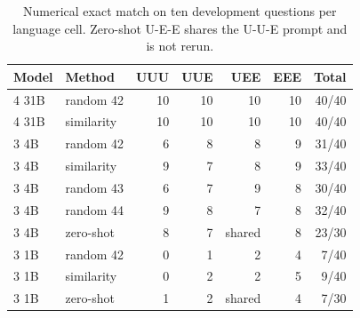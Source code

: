 \begin{table}[t]
\caption{Numerical exact match on ten development questions per language cell. Zero-shot U-E-E shares the U-U-E prompt and is not rerun.}
\label{tab:baseline}
\centering
\setlength{\tabcolsep}{2.6pt}
\small
\begin{tabular}{llrrrrr}
\toprule
Model & Method & UUU & UUE & UEE & EEE & Total \\
\midrule
4 31B & random 42 & 10 & 10 & 10 & 10 & 40/40 \\
4 31B & similarity & 10 & 10 & 10 & 10 & 40/40 \\
3 4B & random 42 & 6 & 8 & 8 & 9 & 31/40 \\
3 4B & similarity & 9 & 7 & 8 & 9 & 33/40 \\
3 4B & random 43 & 6 & 7 & 9 & 8 & 30/40 \\
3 4B & random 44 & 9 & 8 & 7 & 8 & 32/40 \\
3 4B & zero-shot & 8 & 7 & shared & 8 & 23/30 \\
3 1B & random 42 & 0 & 1 & 2 & 4 & 7/40 \\
3 1B & similarity & 0 & 2 & 2 & 5 & 9/40 \\
3 1B & zero-shot & 1 & 2 & shared & 4 & 7/30 \\
\bottomrule
\end{tabular}
\end{table}
